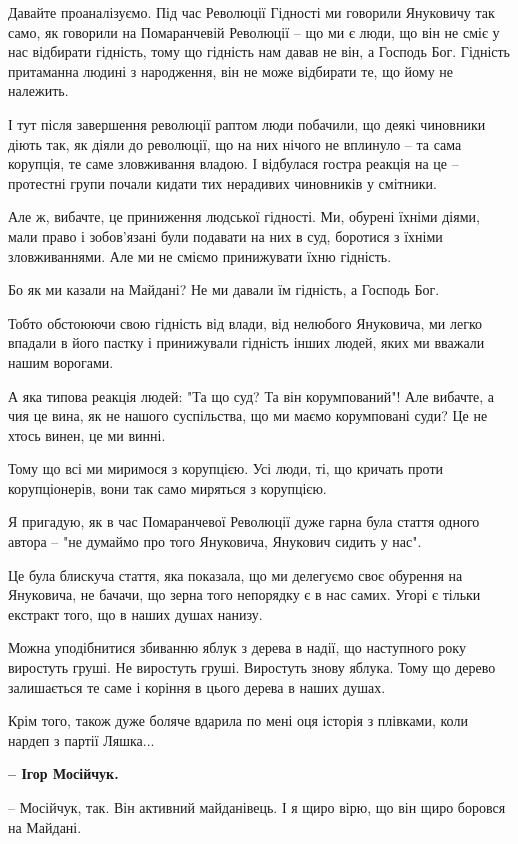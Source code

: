 Давайте проаналізуємо. Під час Революції Гідності ми говорили Януковичу так
само, як говорили на Помаранчевій Революції – що ми є люди, що він не сміє у
нас відбирати гідність, тому що гідність нам давав не він, а Господь Бог.
Гідність притаманна людині з народження, він не може відбирати те, що йому не
належить. 

І тут після завершення революції раптом люди побачили, що деякі чиновники діють
так, як діяли до революції, що на них нічого не вплинуло – та сама корупція, те
саме зловживання владою. І відбулася гостра реакція на це – протестні групи
почали кидати тих нерадивих чиновників у смітники. 

Але ж, вибачте, це приниження людської гідності. Ми, обурені їхніми діями, мали
право і зобов’язані були подавати на них в суд, боротися з їхніми
зловживаннями. Але ми не сміємо принижувати їхню гідність. 

Бо як ми казали на Майдані? Не ми давали їм гідність, а Господь Бог. 

Тобто обстоюючи свою гідність від влади, від нелюбого Януковича, ми легко
впадали в його пастку і принижували гідність інших людей, яких ми вважали нашим
ворогами.

А яка типова реакція людей: "Та що суд? Та він корумпований"! Але вибачте, а
чия це вина, як не нашого суспільства, що ми маємо корумповані суди? Це не
хтось винен, це ми винні. 

Тому що всі ми миримося з корупцією. Усі люди, ті, що кричать проти
корупціонерів, вони так само миряться з корупцією. 

Я пригадую, як в час Помаранчевої Революції дуже гарна була стаття одного
автора – "не думаймо про того Януковича, Янукович сидить у нас". 

Це була блискуча стаття, яка показала, що ми делегуємо своє обурення на
Януковича, не бачачи, що зерна того непорядку є в нас самих. Угорі є тільки
екстракт того, що в наших душах нанизу.  

Можна уподібнитися збиванню яблук з дерева в надії, що наступного року
виростуть груші. Не виростуть груші. Виростуть знову яблука. Тому що дерево
залишається те саме і коріння в цього дерева в наших душах.

Крім того, також дуже боляче вдарила по мені оця історія з плівками, коли
нардеп з партії Ляшка...

\textbf{– Ігор Мосійчук.}

– Мосійчук, так. Він активний майданівець. І я щиро вірю, що він щиро боровся
на Майдані. 


